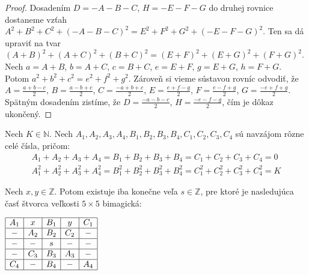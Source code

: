 \begin{proof} Dosadením $D = -A-B-C$, $H = -E-F-G$ do druhej rovnice dostaneme vzťah $A^2 + B^2 + C^2 + (-A-B-C)^2 = E^2 + F^2 + G^2 + (-E-F-G)^2$. Ten sa dá upraviť na tvar $(A+B)^2 + (A+C)^2 + (B+C)^2 = (E+F)^2 + (E+G)^2 + (F+G)^2$. Nech $a = A+B$, $b = A+C$, $c = B+C$, $e = E+F$, $g = E+G$, $h = F+G$. Potom $a^2 + b^2 + c^2 = e^2 + f^2 + g^2$. Zároveň si vieme sústavou rovníc odvodiť, že $A = \frac{a+b-c}{2}$, $B = \frac{a-b+c}{2}$, $C = \frac{-a+b+c}{2}$, $E = \frac{e+f-g}{2}$, $F = \frac{e-f+g}{2}$, $G = \frac{-e+f+g}{2}$. Spätným dosadením zistíme, že $D = \frac{-a-b-c}{2}$, $H = \frac{-e-f-g}{2}$, čím je dôkaz ukončený.
\end{proof}

\begin{theorem}
\label{5x5bimagic3}
Nech $K \in \mathbb{N}$. Nech $A_1, A_2, A_3, A_4, B_1, B_2, B_3, B_4, C_1, C_2, C_3, C_4$ sú navzájom rôzne celé čísla, pričom:
\begin{gather*}
A_1 + A_2 + A_3 + A_4 = B_1 + B_2 + B_3 + B_4 = C_1 + C_2 + C_3 + C_4 = 0 \\
A_1^2 + A_2^2 + A_3^2 + A_4^2 = B_1^2 + B_2^2 + B_3^2 + B_4^2 = C_1^2 + C_2^2 + C_3^2 + C_4^2 = K
\end{gather*}

Nech $x,y \in \mathbb{Z}$. Potom existuje iba konečne veľa $s \in \mathbb{Z}$, pre ktoré je nasledujúca časť štvorca veľkosti $5 \times 5$ bimagická: 

\begin{center}
$\begin{array}{ |c|c|c|c|c| }
\hline
A_1 & x & B_1 & y & C_1 \\ 
\hline
- & A_2 & B_2 & C_2 & -  \\ 
\hline
- & - & s & - & - \\ 
\hline
- & C_3 & B_3 & A_3 & - \\ 
\hline
C_4 & - & B_4 & - & A_4 \\ 
\hline
\end{array}$
\end{center}

\end{theorem}

